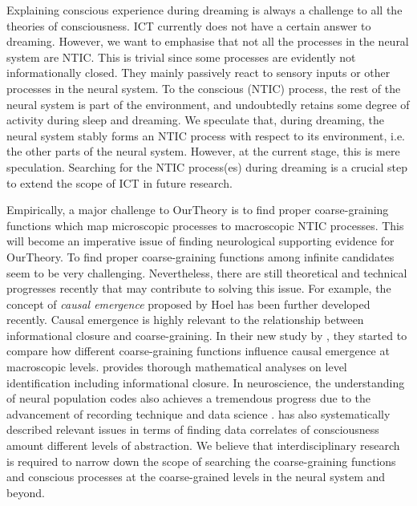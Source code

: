 \documentclass[utf8]{article}
\begin{document}
        Explaining conscious experience during dreaming is always a challenge to all the theories of consciousness. ICT currently does not have a certain answer to dreaming. However, we want to emphasise that not all the processes in the neural system are NTIC. This is trivial since some processes are evidently not informationally closed. They mainly passively react to sensory inputs or other processes in the neural system. To the conscious (NTIC) process, the rest of the neural system is part of the environment, and undoubtedly retains some degree of activity during sleep and dreaming. We speculate that, during dreaming, the neural system stably forms an NTIC process with respect to its environment, i.e. the other parts of the neural system. However, at the current stage, this is mere speculation. Searching for the NTIC process(es) during dreaming is a crucial step to extend the scope of ICT in future research. 
        
        Empirically, a major challenge to \ac{OurTheory} is to find proper coarse-graining functions which map microscopic processes to macroscopic NTIC processes. This will become an imperative issue of finding neurological supporting evidence for \ac{OurTheory}. To find proper coarse-graining functions among infinite candidates \citep{price2007causation} seem to be very challenging. Nevertheless, there are still theoretical and technical progresses recently that may contribute to  solving this issue. For example, the concept of \textit{causal emergence} proposed by Hoel \citep{Hoel19790, Hoel2018} has been further developed recently. Causal emergence is highly relevant to the relationship between informational closure and coarse-graining. In their new study by \cite{klein2019uncertainty}, they started to compare how different coarse-graining functions influence causal emergence at macroscopic levels. \cite{PFANTE.2014, PFANTE.2014b} provides thorough mathematical analyses on level identification including informational closure. In neuroscience, the understanding of neural population codes also achieves a tremendous progress due to the advancement of recording technique and data science \citep{Kohn2016, panzeri2015neural}. \cite{Gamez2016} has also systematically described relevant issues in terms of finding data correlates of consciousness amount different levels of abstraction. We believe that interdisciplinary research is required to narrow down the scope of searching the coarse-graining functions and conscious processes at the coarse-grained levels in the neural system and beyond. 
        
\end{document}
